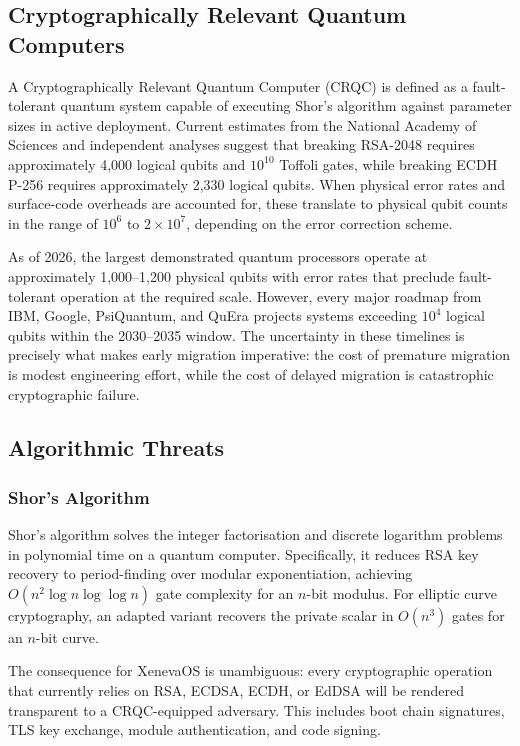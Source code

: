 \documentclass[11pt, a4paper]{article}
\begin{document}
\subsection{Cryptographically Relevant Quantum Computers}\label{sec:crqc}

A Cryptographically Relevant Quantum Computer (CRQC) is defined as a fault-tolerant quantum system capable of executing Shor's algorithm against parameter sizes in active deployment. Current estimates from the National Academy of Sciences and independent analyses suggest that breaking RSA-2048 requires approximately 4,000 logical qubits and $10^{10}$ Toffoli gates, while breaking ECDH P-256 requires approximately 2,330 logical qubits. When physical error rates and surface-code overheads are accounted for, these translate to physical qubit counts in the range of $10^{6}$ to $2 \times 10^{7}$, depending on the error correction scheme.

As of 2026, the largest demonstrated quantum processors operate at approximately 1,000--1,200 physical qubits with error rates that preclude fault-tolerant operation at the required scale. However, every major roadmap from IBM, Google, PsiQuantum, and QuEra projects systems exceeding $10^{4}$ logical qubits within the 2030--2035 window. The uncertainty in these timelines is precisely what makes early migration imperative: the cost of premature migration is modest engineering effort, while the cost of delayed migration is catastrophic cryptographic failure.

\subsection{Algorithmic Threats}\label{sec:algo-threats}

\subsubsection{Shor's Algorithm}

Shor's algorithm solves the integer factorisation and discrete logarithm problems in polynomial time on a quantum computer. Specifically, it reduces RSA key recovery to period-finding over modular exponentiation, achieving $O(n^{2} \log n \log \log n)$ gate complexity for an $n$-bit modulus. For elliptic curve cryptography, an adapted variant recovers the private scalar in $O(n^{3})$ gates for an $n$-bit curve.

The consequence for XenevaOS is unambiguous: every cryptographic operation that currently relies on RSA, ECDSA, ECDH, or EdDSA will be rendered transparent to a CRQC-equipped adversary. This includes boot chain signatures, TLS key exchange, module authentication, and code signing.
\end{document}

